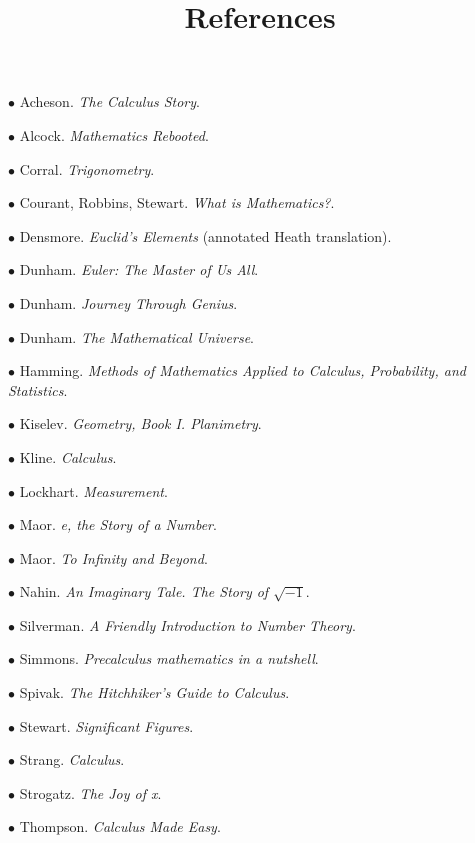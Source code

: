 \documentclass[11pt, oneside]{article}   	%
\title{References}
\date{}
\begin{document}
\maketitle
\Large


$\bullet$ Acheson.  \emph{The Calculus Story}.

$\bullet$ Alcock. \emph{Mathematics Rebooted}.

$\bullet$ Corral. \emph{Trigonometry}.

$\bullet$ Courant, Robbins, Stewart. \emph{What is Mathematics?}.

$\bullet$ Densmore. \emph{Euclid's Elements} (annotated Heath translation).

$\bullet$ Dunham. \emph{Euler:  The Master of Us All}.

$\bullet$ Dunham. \emph{Journey Through Genius}.

$\bullet$ Dunham. \emph{The Mathematical Universe}.

$\bullet$ Hamming.  \emph{Methods of Mathematics Applied to Calculus, Probability, and Statistics}.

$\bullet$ Kiselev. \emph{Geometry, Book I. Planimetry}.

$\bullet$ Kline. \emph{Calculus}.

$\bullet$ Lockhart. \emph{Measurement}.

$\bullet$ Maor. \emph{e, the Story of a Number}.

$\bullet$ Maor. \emph{To Infinity and Beyond}.

$\bullet$ Nahin. \emph{An Imaginary Tale.  The Story of $\sqrt{-1}$}.

$\bullet$ Silverman.  \emph{A Friendly Introduction to Number Theory}.

$\bullet$ Simmons.  \emph{Precalculus mathematics in a nutshell}.

$\bullet$ Spivak.  \emph{The Hitchhiker's Guide to Calculus}.

$\bullet$ Stewart.  \emph{Significant Figures}.

$\bullet$ Strang.  \emph{Calculus}.

$\bullet$ Strogatz.  \emph{The Joy of x}.

$\bullet$ Thompson.  \emph{Calculus Made Easy}.
\end{document}
